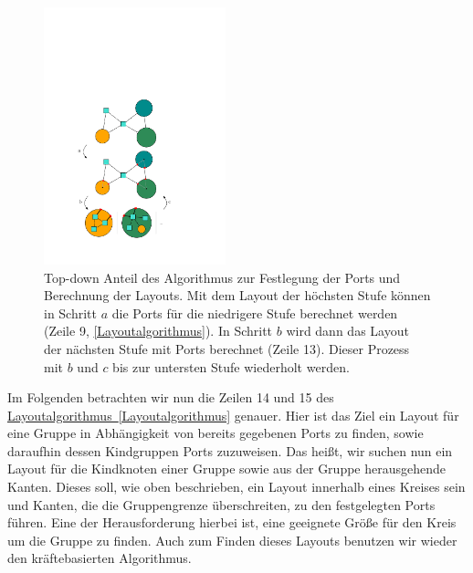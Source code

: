 \begin{figure}[h!]
\begin{center} 
  \includegraphics[width=0.47\textwidth]{Pics/TopDown.pdf}
  \caption{Top-down Anteil des Algorithmus zur Festlegung der Ports und Berechnung der Layouts.
  Mit dem Layout der höchsten Stufe können in Schritt $a$ die Ports für die niedrigere Stufe berechnet werden (Zeile 9, \autoref{Layoutalgorithmus}).
  In Schritt $b$ wird dann das Layout der nächsten Stufe mit Ports berechnet (Zeile 13).
  Dieser Prozess mit $b$ und $c$ bis zur untersten Stufe wiederholt werden. }
  \label{f:TopDown}
\end{center}
\end{figure}


Im Folgenden betrachten wir nun die Zeilen 14 und 15 des \hyperref[Layoutalgorithmus]{Layoutalgorithmus~\ref*{Layoutalgorithmus}} genauer. 
Hier ist das Ziel ein Layout für eine Gruppe in Abhängigkeit von bereits gegebenen Ports zu finden, sowie daraufhin dessen Kindgruppen Ports zuzuweisen.
Das heißt, wir suchen nun ein Layout für die Kindknoten einer Gruppe sowie aus der Gruppe herausgehende Kanten.
Dieses soll, wie oben beschrieben, ein Layout innerhalb eines Kreises sein und Kanten, die die Gruppengrenze überschreiten, zu den festgelegten Ports führen.
Eine der Herausforderung hierbei ist, eine geeignete Größe für den Kreis um die Gruppe zu finden. 
Auch zum Finden dieses Layouts benutzen wir wieder den kräftebasierten Algorithmus.

